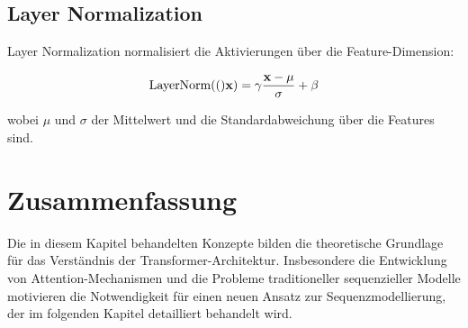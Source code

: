 \subsection{Layer Normalization}

Layer Normalization normalisiert die Aktivierungen über die Feature-Dimension:

\begin{equation}
\text{LayerNorm}(()\mathbf{x}) = \gamma \frac{\mathbf{x} - \mu}{\sigma} + \beta
\end{equation}

wobei $\mu$ und $\sigma$ der Mittelwert und die Standardabweichung über die Features sind.

\section{Zusammenfassung}

Die in diesem Kapitel behandelten Konzepte bilden die theoretische Grundlage für das Verständnis der Transformer-Architektur. Insbesondere die Entwicklung von Attention-Mechanismen und die Probleme traditioneller sequenzieller Modelle motivieren die Notwendigkeit für einen neuen Ansatz zur Sequenzmodellierung, der im folgenden Kapitel detailliert behandelt wird.